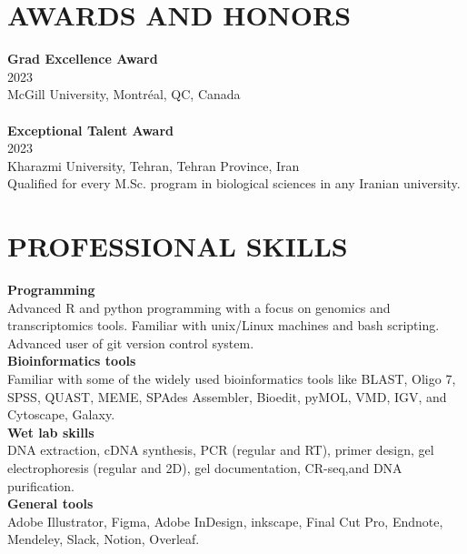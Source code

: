 \documentclass[a4paper,9pt]{extarticle}
\begin{document}

\section*{AWARDS AND HONORS}

\noindent
\newline
\textbf{Grad Excellence Award} \\
2023 \\
McGill University, Montréal, QC, Canada \\
\\
\noindent
\textbf{ Exceptional Talent Award} \\
2023 \\
Kharazmi University, Tehran, Tehran Province, Iran \\
Qualified for every M.Sc. program in biological sciences in any Iranian university.  \\



\section*{PROFESSIONAL SKILLS}

\noindent
\newline
\textbf{Programming} \\
Advanced R and python programming with a focus on genomics and transcriptomics tools. Familiar with unix/Linux machines and bash scripting. Advanced user of git version control system.\\

\noindent
\textbf{Bioinformatics tools} \\
Familiar with some of the widely used bioinformatics tools like BLAST, Oligo 7, SPSS, QUAST, MEME, SPAdes Assembler, Bioedit, pyMOL, VMD, IGV, and  Cytoscape, Galaxy.  \\

\noindent
\textbf{Wet lab skills} \\
DNA extraction, cDNA synthesis, PCR (regular and RT), primer design, gel electrophoresis (regular and 2D), gel documentation, CR-seq,and DNA purification. \\

\noindent
\textbf{General tools} \\
Adobe Illustrator, Figma, Adobe InDesign, inkscape, Final Cut Pro, Endnote, Mendeley, Slack, Notion, Overleaf.
\end{document}
